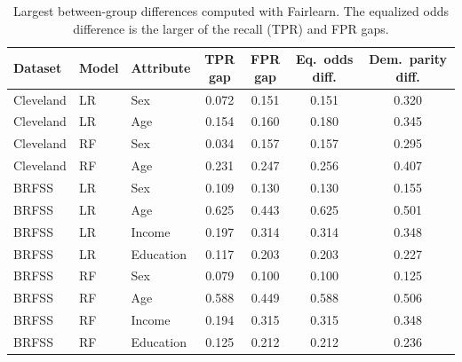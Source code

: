 \begin{table}[h]
\caption{Largest between-group differences computed with Fairlearn. The equalized odds difference is the larger of the recall (TPR) and FPR gaps.}
\label{tab:gaps}
\small\setlength\tabcolsep{4pt}
\begin{tabular}{lllcccc}
\toprule
Dataset & Model & Attribute & TPR gap & FPR gap & Eq.\ odds diff. & Dem.\ parity diff.\\
\midrule
Cleveland & LR & Sex & 0.072 & 0.151 & 0.151 & 0.320\\
Cleveland & LR & Age & 0.154 & 0.160 & 0.180 & 0.345\\
Cleveland & RF & Sex & 0.034 & 0.157 & 0.157 & 0.295\\
Cleveland & RF & Age & 0.231 & 0.247 & 0.256 & 0.407\\
BRFSS & LR & Sex & 0.109 & 0.130 & 0.130 & 0.155\\
BRFSS & LR & Age & 0.625 & 0.443 & 0.625 & 0.501\\
BRFSS & LR & Income & 0.197 & 0.314 & 0.314 & 0.348\\
BRFSS & LR & Education & 0.117 & 0.203 & 0.203 & 0.227\\
BRFSS & RF & Sex & 0.079 & 0.100 & 0.100 & 0.125\\
BRFSS & RF & Age & 0.588 & 0.449 & 0.588 & 0.506\\
BRFSS & RF & Income & 0.194 & 0.315 & 0.315 & 0.348\\
BRFSS & RF & Education & 0.125 & 0.212 & 0.212 & 0.236\\
\bottomrule
\end{tabular}
\end{table}